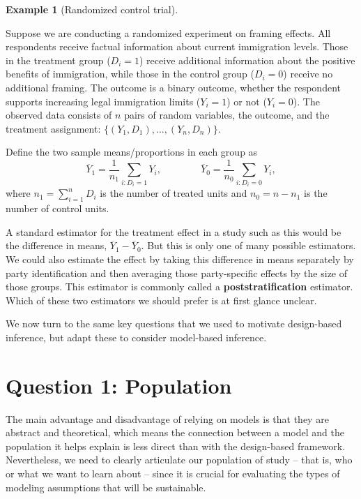 \documentclass[
  13pt,
  letterpaper,
  DIV=11,
  numbers=noendperiod]{scrreprt}
\newcommand{\Ybar}{\overline{Y}}
\theoremstyle{plain}
\theoremstyle{definition}
\newtheorem{example}{Example}[chapter]
\theoremstyle{definition}
\theoremstyle{remark}
\begin{document}
\begin{example}[Randomized control
trial]\protect\hypertarget{exm-rct}{}\label{exm-rct}

Suppose we are conducting a randomized experiment on framing effects.
All respondents receive factual information about current immigration
levels. Those in the treatment group (\(D_i = 1\)) receive additional
information about the positive benefits of immigration, while those in
the control group (\(D_i = 0\)) receive no additional framing. The
outcome is a binary outcome, whether the respondent supports increasing
legal immigration limits (\(Y_i = 1\)) or not (\(Y_i = 0\)). The
observed data consists of \(n\) pairs of random variables, the outcome,
and the treatment assignment: \(\{(Y_1, D_1), \ldots, (Y_n, D_n)\}\).

Define the two sample means/proportions in each group as \[
\Ybar_1 = \frac{1}{n_1} \sum_{i: D_i = 1} Y_i, \qquad\qquad \Ybar_0 = \frac{1}{n_0} \sum_{i: D_i = 0} Y_i,
\] where \(n_1 = \sum_{i=1}^n D_i\) is the number of treated units and
\(n_0 = n - n_1\) is the number of control units.

A standard estimator for the treatment effect in a study such as this
would be the difference in means, \(\Ybar_1 - \Ybar_0\). But this is
only one of many possible estimators. We could also estimate the effect
by taking this difference in means separately by party identification
and then averaging those party-specific effects by the size of those
groups. This estimator is commonly called a \textbf{poststratification}
estimator. Which of these two estimators we should prefer is at first
glance unclear.

\end{example}

We now turn to the same key questions that we used to motivate
design-based inference, but adapt these to consider model-based
inference.

\section{Question 1: Population}\label{question-1-population-1}

The main advantage and disadvantage of relying on models is that they
are abstract and theoretical, which means the connection between a model
and the population it helps explain is less direct than with the
design-based framework. Nevertheless, we need to clearly articulate our
population of study -- that is, who or what we want to learn about --
since it is crucial for evaluating the types of modeling assumptions
that will be sustainable.
\end{document}
